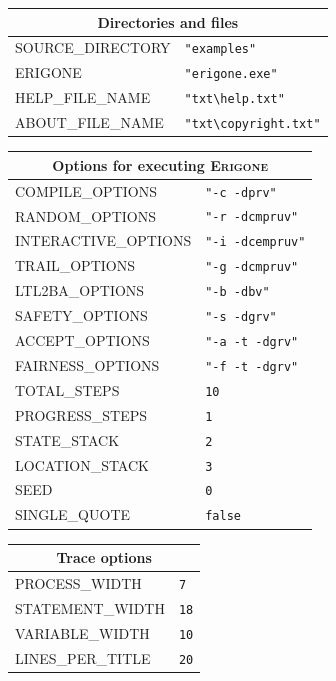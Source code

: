 \documentclass[11pt]{article}
\newcommand{\eri}{\textsc{Erigone}}
\begin{document}
\begin{center}

\begin{tabular}{|p{}|p{}|}
\hline
\multicolumn{2}{|c|}{Directories and files}\\ \hline
\textsc{\ttfamily SOURCE\_DIRECTORY} & \verb+"examples"+ \\
\textsc{\ttfamily ERIGONE} &\verb+"erigone.exe"+ \\
\textsc{\ttfamily HELP\_FILE\_NAME} &\verb+"txt\help.txt"+\\
\textsc{\ttfamily ABOUT\_FILE\_NAME} &\verb+"txt\copyright.txt"+\\
\hline
\end{tabular}

\bigskip

\begin{tabular}{|p{}|p{}|}
\hline
\multicolumn{2}{|c|}{Options for executing \eri{}}\\ \hline
\textsc{\ttfamily COMPILE\_OPTIONS} &\verb+"-c -dprv"+\\
\textsc{\ttfamily RANDOM\_OPTIONS} &\verb+"-r -dcmpruv"+\\
\textsc{\ttfamily INTERACTIVE\_OPTIONS} &\verb+"-i -dcempruv"+\\
\textsc{\ttfamily TRAIL\_OPTIONS} &\verb+"-g -dcmpruv"+\\
\textsc{\ttfamily LTL2BA\_OPTIONS} &\verb+"-b -dbv"+\\
\textsc{\ttfamily SAFETY\_OPTIONS} &\verb+"-s -dgrv"+\\
\textsc{\ttfamily ACCEPT\_OPTIONS} &\verb+"-a -t -dgrv"+\\
\textsc{\ttfamily FAIRNESS\_OPTIONS} &\verb+"-f -t -dgrv"+\\

\textsc{\ttfamily TOTAL\_STEPS} & \verb+10+\\
\textsc{\ttfamily PROGRESS\_STEPS} & \verb+1+\\
\textsc{\ttfamily STATE\_STACK} & \verb+2+\\
\textsc{\ttfamily LOCATION\_STACK} & \verb+3+\\
\textsc{\ttfamily SEED} & \verb+0+\\
\textsc{\ttfamily SINGLE\_QUOTE} & \verb+false+\\\hline
\end{tabular}

\bigskip

\begin{tabular}{|p{}|p{}|}
\hline
\multicolumn{2}{|c|}{Trace options}\\ \hline
\textsc{\ttfamily PROCESS\_WIDTH} & \verb+7+\\
\textsc{\ttfamily STATEMENT\_WIDTH} & \verb+18+\\
\textsc{\ttfamily VARIABLE\_WIDTH} &\verb+10+\\
\textsc{\ttfamily LINES\_PER\_TITLE} &\verb+20+\\
\hline
\end{tabular}


\end{center}
\end{document}
